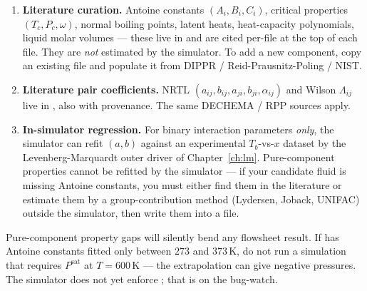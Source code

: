 \documentclass[11pt,a4paper]{article}
\newcommand{\Psat}{P^{\mathrm{sat}}}
\begin{document}
\begin{enumerate}[leftmargin=*,nosep,topsep=2pt]
  \item \textbf{Literature curation.} Antoine constants $(A_i, B_i,
        C_i)$, critical properties $(T_c, P_c, \omega)$, normal
        boiling points, latent heats, heat-capacity polynomials,
        liquid molar volumes --- these live in
         and are
        cited per-file at the top of each file. They are
        \emph{not} estimated by the simulator. To add a new component,
        copy an existing  file and populate it from DIPPR /
        Reid-Prausnitz-Poling \cite{RPP} / NIST.
  \item \textbf{Literature pair coefficients.} NRTL
        $(a_{ij}, b_{ij}, a_{ji}, b_{ji}, \alpha_{ij})$ and Wilson
        $\Lambda_{ij}$ live in
        ,
        also with provenance. The same DECHEMA / RPP sources apply.
  \item \textbf{In-simulator regression.} For binary
        interaction parameters \emph{only}, the simulator can refit
        $(a, b)$ against an experimental $T_b$-vs-$x$ dataset by
        the Levenberg-Marquardt outer driver of Chapter~\ref{ch:lm}.
        Pure-component properties cannot be refitted by the simulator
        --- if your candidate fluid is missing Antoine constants, you
        must either find them in the literature or estimate them by a
        group-contribution method (Lydersen, Joback, UNIFAC) outside
        the simulator, then write them into a  file.
\end{enumerate}

\begin{pitfall}
Pure-component property gaps will silently bend any flowsheet result.
If  has Antoine constants fitted only between $273$
and $373$\,K, do not run a simulation that requires $\Psat$ at $T =
600$\,K --- the extrapolation can give negative pressures. The
simulator does not yet enforce ; that is on the
bug-watch.
\end{pitfall}

\clearpage
\clearpage
\end{document}
